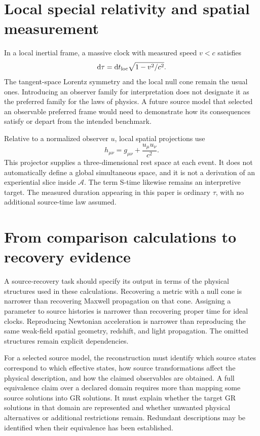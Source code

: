 \documentclass[11pt,oneside]{report}
\newcommand{\Sub}{\mathcal A}
\newcommand{\dd}{\mathrm d}
\theoremstyle{remark}
\numberwithin{definition}{chapter}
\numberwithin{proposition}{chapter}
\numberwithin{remark}{chapter}
\begin{document}
\section{Local special relativity and spatial measurement}
In a local inertial frame, a massive clock with measured speed $v<c$ satisfies
\begin{equation}
\dd\tau=\dd t_{\rm loc}\sqrt{1-v^2/c^2}.
\label{relativistic_recovery:eq:kinematictimedilation}
\end{equation}
The tangent-space Lorentz symmetry and the local null cone remain the usual ones. Introducing an observer family for interpretation does not designate it as the preferred family for the laws of physics. A future source model that selected an observable preferred frame would need to demonstrate how its consequences satisfy or depart from the intended benchmark.

Relative to a normalized observer $u$, local spatial projections use
\begin{equation}
h_{\mu\nu}=g_{\mu\nu}+\frac{u_\mu u_\nu}{c^2}.
\label{relativistic_recovery:eq:spatialprojector}
\end{equation}
This projector supplies a three-dimensional rest space at each event. It does not automatically define a global simultaneous space, and it is not a derivation of an experiential slice inside $\Sub$. The term S-time likewise remains an interpretive target. The measured duration appearing in this paper is ordinary $\tau$, with no additional source-time law assumed.

\section{From comparison calculations to recovery evidence}
A source-recovery task should specify its output in terms of the physical structures used in these calculations. Recovering a metric with a null cone is narrower than recovering Maxwell propagation on that cone. Assigning a parameter to source histories is narrower than recovering proper time for ideal clocks. Reproducing Newtonian acceleration is narrower than reproducing the same weak-field spatial geometry, redshift, and light propagation. The omitted structures remain explicit dependencies.

For a selected source model, the reconstruction must identify which source states correspond to which effective states, how source transformations affect the physical description, and how the claimed observables are obtained. A full equivalence claim over a declared domain requires more than mapping some source solutions into GR solutions. It must explain whether the target GR solutions in that domain are represented and whether unwanted physical alternatives or additional restrictions remain. Redundant descriptions may be identified when their equivalence has been established.
\end{document}
